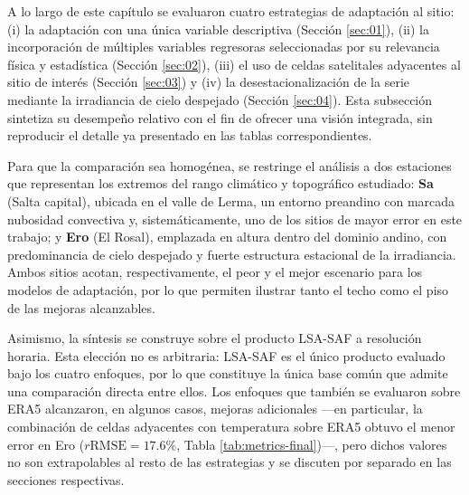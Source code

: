 A lo largo de este capítulo se evaluaron cuatro estrategias de adaptación al sitio: (i) la adaptación con una única variable descriptiva (Sección \ref{sec:01}), (ii) la incorporación de múltiples variables regresoras seleccionadas por su relevancia física y estadística (Sección \ref{sec:02}), (iii) el uso de celdas satelitales adyacentes al sitio de interés (Sección \ref{sec:03}) y (iv) la desestacionalización de la serie mediante la irradiancia de cielo despejado (Sección \ref{sec:04}). Esta subsección sintetiza su desempeño relativo con el fin de ofrecer una visión integrada, sin reproducir el detalle ya presentado en las tablas correspondientes.


Para que la comparación sea homogénea, se restringe el análisis a dos estaciones que representan los extremos del rango climático y topográfico estudiado: \textbf{Sa} (Salta capital), ubicada en el valle de Lerma, un entorno preandino con marcada nubosidad convectiva y, sistemáticamente, uno de los sitios de mayor error en este trabajo; y \textbf{Ero} (El Rosal), emplazada en altura dentro del dominio andino, con predominancia de cielo despejado y fuerte estructura estacional de la irradiancia. Ambos sitios acotan, respectivamente, el peor y el mejor escenario para los modelos de adaptación, por lo que permiten ilustrar tanto el techo como el piso de las mejoras alcanzables.

Asimismo, la síntesis se construye sobre el producto \mbox{LSA-SAF} a resolución horaria. Esta elección no es arbitraria: \mbox{LSA-SAF} es el único producto evaluado bajo los cuatro enfoques, por lo que constituye la única base común que admite una comparación directa entre ellos. Los enfoques que también se evaluaron sobre ERA5 alcanzaron, en algunos casos, mejoras adicionales —en particular, la combinación de celdas adyacentes con temperatura sobre ERA5 obtuvo el menor error en Ero ($r\mathrm{RMSE}=17.6\%$, Tabla \ref{tab:metrics-final})—, pero dichos valores no son extrapolables al resto de las estrategias y se discuten por separado en las secciones respectivas.



